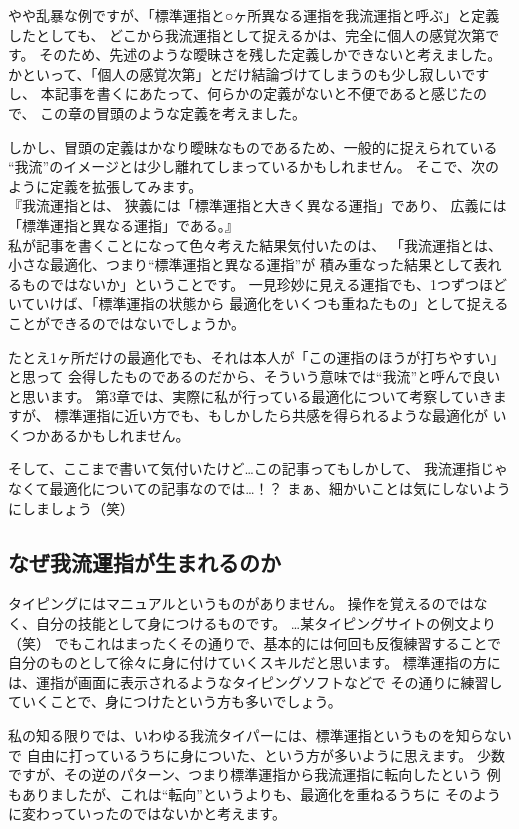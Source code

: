 やや乱暴な例ですが、「標準運指と○ヶ所異なる運指を我流運指と呼ぶ」と定義したとしても、
どこから我流運指として捉えるかは、完全に個人の感覚次第です。
そのため、先述のような曖昧さを残した定義しかできないと考えました。
かといって、「個人の感覚次第」とだけ結論づけてしまうのも少し寂しいですし、
本記事を書くにあたって、何らかの定義がないと不便であると感じたので、
この章の冒頭のような定義を考えました。

しかし、冒頭の定義はかなり曖昧なものであるため、一般的に捉えられている
“我流”のイメージとは少し離れてしまっているかもしれません。
そこで、次のように定義を拡張してみます。\\

『我流運指とは、
狭義には「標準運指と大きく異なる運指」であり、
広義には「標準運指と異なる運指」である。』\\

私が記事を書くことになって色々考えた結果気付いたのは、
「我流運指とは、小さな最適化、つまり“標準運指と異なる運指”が
積み重なった結果として表れるものではないか」ということです。
一見珍妙に見える運指でも、1つずつほどいていけば、「標準運指の状態から
最適化をいくつも重ねたもの」として捉えることができるのではないでしょうか。

たとえ1ヶ所だけの最適化でも、それは本人が「この運指のほうが打ちやすい」と思って
会得したものであるのだから、そういう意味では“我流”と呼んで良いと思います。
第3章では、実際に私が行っている最適化について考察していきますが、
標準運指に近い方でも、もしかしたら共感を得られるような最適化が
いくつかあるかもしれません。

そして、ここまで書いて気付いたけど…この記事ってもしかして、
我流運指じゃなくて最適化についての記事なのでは…！？
まぁ、細かいことは気にしないようにしましょう（笑）



\subsection{なぜ我流運指が生まれるのか}


タイピングにはマニュアルというものがありません。
操作を覚えるのではなく、自分の技能として身につけるものです。
…某タイピングサイトの例文より（笑）
でもこれはまったくその通りで、基本的には何回も反復練習することで
自分のものとして徐々に身に付けていくスキルだと思います。
標準運指の方には、運指が画面に表示されるようなタイピングソフトなどで
その通りに練習していくことで、身につけたという方も多いでしょう。

私の知る限りでは、いわゆる我流タイパーには、標準運指というものを知らないで
自由に打っているうちに身についた、という方が多いように思えます。
少数ですが、その逆のパターン、つまり標準運指から我流運指に転向したという
例もありましたが、これは“転向”というよりも、最適化を重ねるうちに
そのように変わっていったのではないかと考えます。


